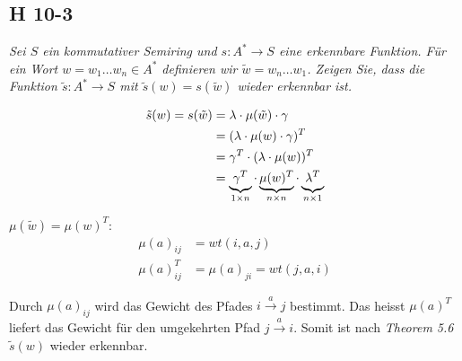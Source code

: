 \documentclass{scrartcl}
\begin{document}
\subsection{H 10-3}

\textsl{Sei $S$ ein kommutativer Semiring und $s: A^* \rightarrow S$ eine erkennbare Funktion. Für ein Wort $w = w_1 \ldots w_n \in A^*$ definieren wir $\tilde{w} = w_n \ldots w_1$. Zeigen Sie, dass die Funktion $\tilde{s} : A^* \rightarrow S$ mit $\tilde{s}(w) = s(\tilde{w})$ wieder erkennbar ist.}

\begin{align*}
    \tilde{s}(w) = s(\tilde{w}) &= \lambda \cdot \mu(\tilde{w}) \cdot \gamma\\
                 &= (\lambda \cdot \mu(w) \cdot \gamma)^T\\
                 &= \gamma^T \cdot (\lambda \cdot \mu(w))^T\\
                 &= \underbrace{\gamma^T \vphantom{\mu(w)^T}}_{1 \times n} \cdot \underbrace{\mu(w)^T}_{n \times n} \cdot \underbrace{\lambda^T \vphantom{\mu(w)^T}}_{n \times 1}\\
\end{align*}

$\mu(\tilde{w}) = \mu(w)^T$:
\begin{align*}
    \mu(a)_{ij} &= wt(i, a, j)\\
    \mu(a)_{ij}^T &= \mu(a)_{ji} = wt(j, a, i)
\end{align*}

Durch $\mu(a)_{ij}$ wird das Gewicht des Pfades $i\stackrel{a}{\rightarrow}j$ bestimmt. Das heisst $\mu(a)^T$ liefert das Gewicht für den umgekehrten Pfad $j\stackrel{a}{\rightarrow}i$. Somit ist nach \emph{Theorem 5.6} $\tilde{s}(w)$ wieder erkennbar.
\end{document}
